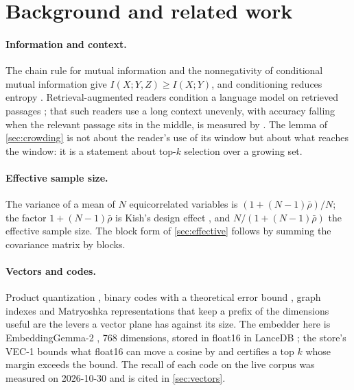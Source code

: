 \documentclass[11pt]{article}
\theoremstyle{plain}
\theoremstyle{definition}
\theoremstyle{remark}
\begin{document}
\section{Background and related work}
\paragraph{Information and context.} The chain rule for mutual information and the nonnegativity
of conditional mutual information give $I(X;Y,Z)\ge I(X;Y)$, and conditioning reduces entropy
\citep[Theorems 2.5.2 and 2.6.5]{cover2006}. Retrieval-augmented readers condition a language model
on retrieved passages \citep{lewis2020rag}; that such readers use a long context unevenly, with
accuracy falling when the relevant passage sits in the middle, is measured by \citet{liu2024lost}.
The lemma of \cref{sec:crowding} is not about the reader's use of its window but about what reaches
the window: it is a statement about top-$k$ selection over a growing set.

\paragraph{Effective sample size.} The variance of a mean of $N$ equicorrelated variables is
$(1+(N-1)\bar\rho)/N$; the factor $1+(N-1)\bar\rho$ is Kish's design effect \citep{kish1965}, and
$N/(1+(N-1)\bar\rho)$ the effective sample size. The block form of \cref{sec:effective} follows by
summing the covariance matrix by blocks.

\paragraph{Vectors and codes.} Product quantization \citep{jegou2011pq}, binary codes with a
theoretical error bound \citep{gao2024rabitq}, graph indexes \citep{malkov2020hnsw} and
Matryoshka representations that keep a prefix of the dimensions useful \citep{kusupati2022matryoshka}
are the levers a vector plane has against its size. The embedder here is EmbeddingGemma-2
\citep{vera2025embeddinggemma}, 768 dimensions, stored in float16 \citep{ieee754} in LanceDB
\citep{lancedb}; the store's VEC-1 bounds what float16 can move a cosine by and certifies a top $k$
whose margin exceeds the bound. The recall of each code on the live corpus was measured on
2026-10-30 and is cited in \cref{sec:vectors}.
\end{document}
